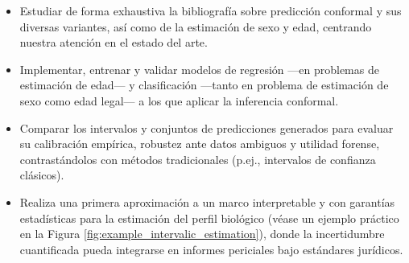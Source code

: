 \begin{itemize}

    \item Estudiar de forma exhaustiva la bibliografía sobre predicción conformal y sus diversas variantes, así como de la estimación de sexo y edad, centrando nuestra atención en el estado del arte.


    \item Implementar, entrenar y validar modelos de regresión ---en problemas de estimación de edad--- y clasificación ---tanto en problema de estimación de sexo como edad legal--- a los que aplicar la inferencia conformal.

    \item Comparar los intervalos y conjuntos de predicciones generados para evaluar su calibración empírica, robustez ante datos ambiguos y utilidad forense, contrastándolos con métodos tradicionales (p.ej., intervalos de confianza clásicos).  

    \item Realiza una primera aproximación a un marco interpretable y con garantías estadísticas para la estimación del perfil biológico (véase un ejemplo práctico en la Figura \ref{fig:example_intervalic_estimation}), donde la incertidumbre cuantificada pueda integrarse en informes periciales bajo estándares jurídicos.

\end{itemize}

    

